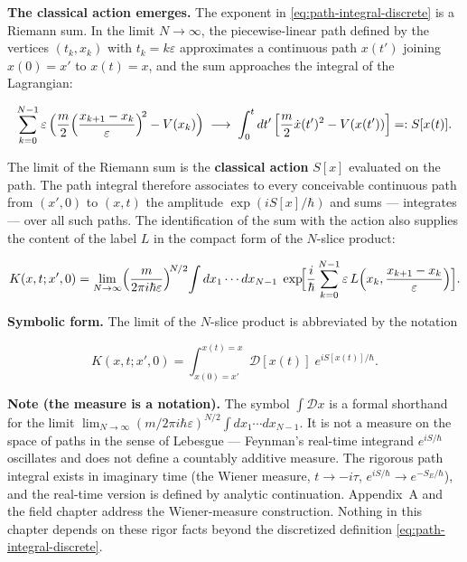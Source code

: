 \medskip\noindent\textbf{The classical action emerges.} The exponent in \eqref{eq:path-integral-discrete} is a Riemann sum. In the limit $N \to \infty$, the piecewise-linear path defined by the vertices $(t_k, x_k)$ with $t_k = k\varepsilon$ approximates a continuous path $x(t')$ joining $x(0) = x'$ to $x(t) = x$, and the sum approaches the integral of the Lagrangian:
\begin{linenomath}
\begin{equation*}
\sum_{k=0}^{N-1}\varepsilon\,
\Bigl(\frac{m}{2}\Bigl(\frac{x_{k+1}-x_k}{\varepsilon}\Bigr)^{\!2}
- V(x_k)\Bigr)
\;\longrightarrow\; \int_0^t dt'\,\Bigl[\frac{m}{2}\dot{x}(t')^2 - V(x(t'))\Bigr]
=: S[x(t)] .
\end{equation*}
\end{linenomath}
The limit of the Riemann sum is the \textbf{classical action} $S[x]$ evaluated on the path. The path integral therefore associates to every conceivable continuous path from $(x',0)$ to $(x,t)$ the amplitude $\exp(iS[x]/\hbar)$ and sums --- integrates --- over all such paths. The identification of the sum with the action also supplies the content of the label $L$ in the compact form of the $N$-slice product:
\begin{linenomath}
\begin{equation}
K(x,t;x',0) = \lim_{N\to\infty}
\Bigl(\frac{m}{2\pi i\hbar\varepsilon}\Bigr)^{\!N/2}\!
\int dx_1\cdots dx_{N-1}\;
\exp\!\Bigl[\frac{i}{\hbar}\sum_{k=0}^{N-1}\varepsilon\,
L\Bigl(x_k,\frac{x_{k+1}-x_k}{\varepsilon}\Bigr)\Bigr] .
\label{eq:n-slice-product}
\end{equation}
\end{linenomath}

\medskip\noindent\textbf{Symbolic form.} The limit of the $N$-slice product is abbreviated by the notation
\begin{linenomath}
\begin{equation}
\boxed{K(x,t;x',0) = \int_{x(0)=x'}^{x(t)=x} \mathcal{D}[x(t)]\;
e^{iS[x(t)]/\hbar}} .
\label{eq:path-integral-symbolic}
\end{equation}
\end{linenomath}

\begin{note}
\textbf{Note (the measure is a notation).} The symbol $\int\mathcal{D}x$ is a formal shorthand for the limit $\lim_{N\to\infty}(m/2\pi i\hbar\varepsilon)^{N/2}\int dx_1\cdots dx_{N-1}$. It is not a measure on the space of paths in the sense of Lebesgue --- Feynman's real-time integrand $e^{iS/\hbar}$ oscillates and does not define a countably additive measure. The rigorous path integral exists in imaginary time (the Wiener measure, $t \to -i\tau$, $e^{iS/\hbar} \to e^{-S_E/\hbar}$), and the real-time version is defined by analytic continuation. Appendix~A and the field chapter address the Wiener-measure construction. Nothing in this chapter depends on these rigor facts beyond the discretized definition \eqref{eq:path-integral-discrete}.
\end{note}

